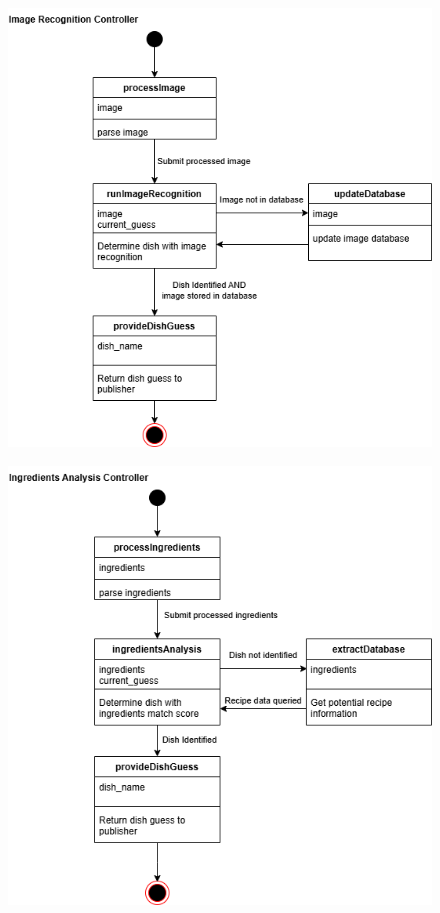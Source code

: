 \documentclass[]{article}
\begin{document}
\begin{figure}[H]
	\centering
   \includegraphics[width=\textwidth]{image/D3_state_diagrams/image_recognition.png}
\end{figure}

\begin{figure}[H]
	\centering
   \includegraphics[width=\textwidth]{image/D3_state_diagrams/ingredients_analysis.png}
\end{figure}
\end{document}

